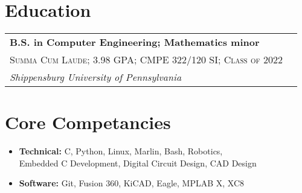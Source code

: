 \documentclass[
	10pt, %
]{FreemanCV}
\begin{document}
\begin{paracol}{2}

\section{Education} 


\begin{supertabular}{l l} %

	
	\textbf{B.S. in Computer Engineering; Mathematics minor}\\ %
	\small\textsc{Summa Cum Laude; 3.98 GPA; CMPE 322/120 SI; Class of 2022}\\ %
	\textit{Shippensburg University of Pennsylvania}\\ %
	

\end{supertabular}

\switchcolumn

\section{Core Competancies}

\begin{itemize}[leftmargin=10pt]
	\itemsep0pt
	\item \textbf{Technical:} C, Python, Linux, Marlin, Bash, Robotics,\\
	\hspace*{0pt}Embedded C Development, Digital Circuit Design, CAD Design
	\item \textbf{Software:} Git, Fusion 360, KiCAD, Eagle, MPLAB X, XC8
\end{itemize}



\end{paracol}
\end{document}
